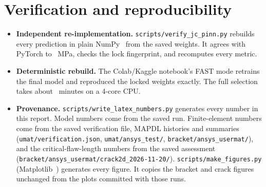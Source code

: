 \documentclass[11pt,a4paper]{article}
\newcommand{\file}[1]{\nolinkurl{#1}}
\begin{document}
\section{Verification and reproducibility}
\begin{itemize}
\item \textbf{Independent re-implementation.} \file{scripts/verify_jc_pinn.py} rebuilds every prediction in plain NumPy~\cite{harris2020} from the saved weights. It agrees with PyTorch to \nNumpyTorchErr~MPa, checks the lock fingerprint, and recomputes every metric.
\item \textbf{Deterministic rebuild.} The Colab/Kaggle notebook's FAST mode retrains the final model and reproduced the locked weights exactly. The full selection takes about \nRunMinutes~minutes on a 4-core CPU.
\item \textbf{Provenance.} \file{scripts/write_latex_numbers.py} generates every number in this report. Model numbers come from the saved run. Finite-element numbers come from the saved verification file, MAPDL histories and summaries (\file{umat/verification.json}, \file{umat/ansys_test/}, \file{bracket/ansys_usermat/}), and the critical-flaw-length numbers from the saved assessment (\file{bracket/ansys_usermat/crack2d_2026-11-20/}). \file{scripts/make_figures.py} (Matplotlib~\cite{hunter2007}) generates every figure. It copies the bracket and crack figures unchanged from the plots committed with those runs.
\end{itemize}

\end{document}
